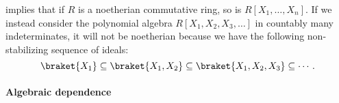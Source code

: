 \begin{example}\label{ex:countable_indeterminates_non_noetherian}
   implies that if \( R \) is a noetherian commutative ring, so is \( R[X_1, \ldots, X_n] \). If we instead consider the polynomial algebra \( R[X_1, X_2, X_3, \ldots] \) in countably many indeterminates, it will not be noetherian because we have the following non-stabilizing sequence of ideals:
  \begin{equation*}
    \braket{ X_1 } \subseteq \braket{ X_1, X_2 } \subseteq \braket{ X_1, X_2, X_3 } \subseteq \cdots.
  \end{equation*}
\end{example}

\paragraph{Algebraic dependence}

